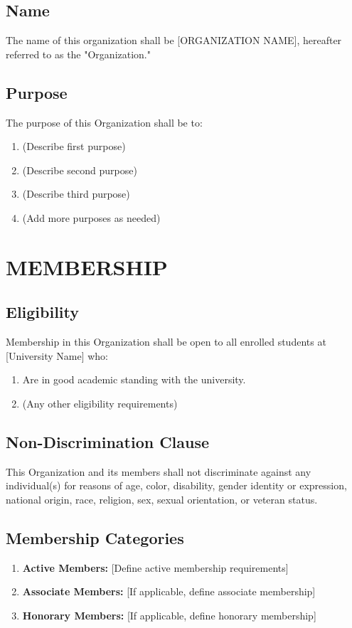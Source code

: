 \documentclass[12pt,letterpaper]{article}
\begin{document}
\subsection{Name}
The name of this organization shall be [ORGANIZATION NAME], hereafter referred to as the "Organization."

\subsection{Purpose}
The purpose of this Organization shall be to:
\begin{enumerate}[label=\alph*., leftmargin=2em]
    \item (Describe first purpose)
    \item (Describe second purpose)
    \item (Describe third purpose)
    \item (Add more purposes as needed)
\end{enumerate}

\section{MEMBERSHIP}

\subsection{Eligibility}
Membership in this Organization shall be open to all enrolled students at [University Name] who:
\begin{enumerate}[label=\alph*., leftmargin=2em]
    \item Are in good academic standing with the university.
    \item (Any other eligibility requirements)
\end{enumerate}

\subsection{Non-Discrimination Clause}
This Organization and its members shall not discriminate against any individual(s) for reasons of age, color, disability, gender identity or expression, national origin, race, religion, sex, sexual orientation, or veteran status.

\subsection{Membership Categories}
\begin{enumerate}[label=\alph*., leftmargin=2em]
    \item \textbf{Active Members:} [Define active membership requirements]
    \item \textbf{Associate Members:} [If applicable, define associate membership]
    \item \textbf{Honorary Members:} [If applicable, define honorary membership]
\end{enumerate}
\end{document}
